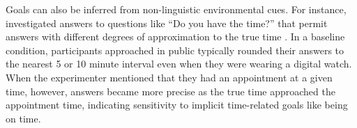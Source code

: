 \documentclass[12pt, floatsintext, jou]{apa6}
\begin{document}
Goals can also be inferred from non-linguistic environmental cues. 
For instance,  investigated answers to questions like ``Do you have the time?'' that permit answers with different degrees of approximation to the true time \cite<see also>{GibbsBryant08_OptimalRelevance}. 
In a baseline condition, participants approached in public typically rounded their answers to the nearest 5 or 10 minute interval even when they were wearing a digital watch. 
When the experimenter mentioned that they had an appointment at a given time, however, answers became more precise as the true time approached the appointment time, indicating sensitivity to implicit time-related goals like being on time.  

\end{document}
